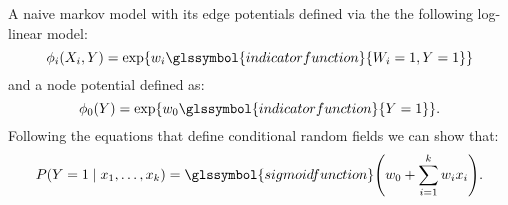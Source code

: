 {%
  A \gls{naive markov model} with its \glspl{edge potential} defined via the the following \gls{log-linear model}:
  \begin{equation*}
  \phi_i(X_i,Y)=\exp\{w_i\glssymbol{indicator function}\{W_i=1,Y=1\}\}
  \end{equation*}
  and a \gls{node potential} defined as:
  \begin{equation*}
    \phi_0(Y)=\exp\{w_0\glssymbol{indicator function}\{Y=1\}\}.
  \end{equation*}
  Following the equations that define \glspl{conditional random field} we can show that:
  \begin{equation*}
    P(Y=1\mid x_1,\dots,x_k)=\glssymbol{sigmoid function}\Bigg( w_0+\sum_{i=1}^k w_i x_i \Bigg) .
  \end{equation*}
}




